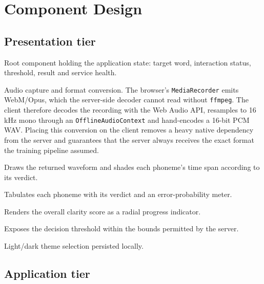 \section{Component Design}
\label{sec:components}

\subsection{Presentation tier}

\begin{description}[leftmargin=0.6cm,style=nextline]
  \item[\texttt{App}] Root component holding the application state: target word,
        interaction status, threshold, result and service health.
  \item[\texttt{Recorder} / \texttt{toWav16k}] Audio capture and format
        conversion. The browser's \texttt{MediaRecorder} emits WebM/Opus, which
        the server-side decoder cannot read without \texttt{ffmpeg}. The client
        therefore decodes the recording with the Web Audio API, resamples to
        16\,kHz mono through an \texttt{OfflineAudioContext} and hand-encodes a
        16-bit PCM WAV. Placing this conversion on the client removes a heavy
        native dependency from the server and guarantees that the server always
        receives the exact format the training pipeline assumed.
  \item[\texttt{WaveformChart}] Draws the returned waveform and shades each
        phoneme's time span according to its verdict.
  \item[\texttt{PhonemeList}] Tabulates each phoneme with its verdict and an
        error-probability meter.
  \item[\texttt{ScoreRing}] Renders the overall clarity score as a radial
        progress indicator.
  \item[\texttt{ThresholdSlider}] Exposes the decision threshold within the
        bounds permitted by the server.
  \item[\texttt{ThemeToggle}] Light/dark theme selection persisted locally.
\end{description}

\subsection{Application tier}

